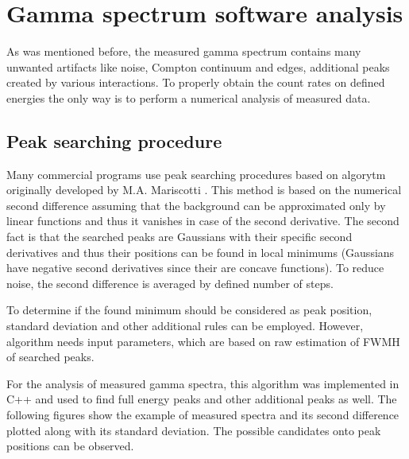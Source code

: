 \chapter{Gamma spectrum software analysis}
As was mentioned before, the measured gamma spectrum contains many unwanted artifacts like noise, Compton continuum and edges, additional peaks created by various interactions. To properly obtain the count rates on defined energies the only way is to perform a numerical analysis of measured data.


\section{Peak searching procedure}
Many commercial programs use peak searching procedures based on algorytm originally developed by M.A. Mariscotti \cite{MARISCOTTI1967309}. This method is based on the numerical second difference assuming that the background can be approximated only by linear functions and thus it vanishes in case of the second derivative. The second fact is that the searched peaks are Gaussians with their specific second derivatives and thus their positions can be found in local minimums (Gaussians have negative second derivatives since their are concave functions). To reduce noise, the second difference is averaged by defined number of steps.
\par
To determine if the found minimum should be considered as peak position, standard deviation and other additional rules can be employed. However, algorithm needs input parameters, which are based on raw estimation of FWMH of searched peaks.
\par
For the analysis of measured gamma spectra, this algorithm was implemented in C++ and used to find full energy peaks and other additional peaks as well. The following figures show the example of measured spectra and its second difference plotted along with its standard deviation. The possible candidates onto peak positions can be observed.
\par
